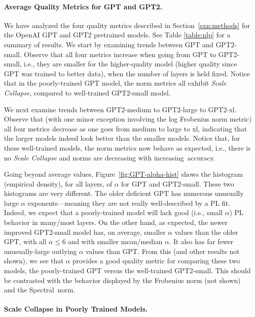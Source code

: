 \vspace{-1mm}
\paragraph{Average Quality Metrics for GPT and GPT2.}

We have analyzed the four quality metrics described in Section~\ref{sxn:methods} for the OpenAI GPT and GPT2 pretrained models.
See Table \ref{table:nlp} for a summary of results.
We start by examining trends between GPT and GPT2-small.
Observe that all four metrics increase when going from GPT to GPT2-small, i.e., they are smaller for the higher-quality model (higher quality since GPT was trained to better data), when the number of layers is held fixed.
Notice that in the poorly-trained GPT model, the norm metrics all exhibit \emph{Scale Collapse}, compared to well-trained GPT2-small model.

We next examine trends between GPT2-medium to GPT2-large to GPT2-xl.
Observe that (with one minor exception involving the log Frobenius norm metric) all four metrics decrease as one goes from medium to large to xl, indicating that the larger models indeed look better than the smaller models.
Notice that, for these well-trained models, the norm metrics now behave as expected, i.e., there is no \emph{Scale Collapse} and norms are decreasing with increasing~accuracy.

Going beyond average values, Figure~\ref{fig:GPT-alpha-hist} shows the histogram (empirical density), for all layers, of $\alpha$ for GPT and GPT2-small.  
These two histograms are very different.
The older deficient GPT has numerous unusually large $\alpha$ exponents---meaning they are not really well-described by a PL fit.
Indeed, we expect that a poorly-trained model will lack good (i.e., small $\alpha$) PL behavior in many/most layers.
On the other hand, as expected, the newer improved GPT2-small model has, on average, smaller $\alpha$ values than the older GPT, with all $\alpha\le6$ and with smaller mean/median $\alpha$.
It also has far fewer unusually-large outlying $\alpha$ values than GPT.
From this (and other results not shown), we see that $\alpha$ provides a good quality metric for comparing these two models, the poorly-trained GPT versus the well-trained GPT2-small.
%
This should be contrasted with the behavior displayed by the Frobenius norm (not shown) and the Spectral~norm.


\vspace{-1mm}
\paragraph{Scale Collapse in Poorly Trained Models.}

